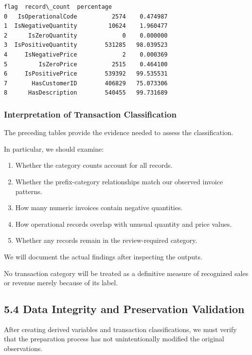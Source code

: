 \documentclass[11pt]{article}
\providecommand{\tightlist}{%
      \setlength{\itemsep}{0pt}\setlength{\parskip}{0pt}}
\begin{document}
    
    \begin{Verbatim}[commandchars=\\\{\}]
                 flag  record\_count  percentage
0   IsOperationalCode          2574    0.474987
1  IsNegativeQuantity         10624    1.960477
2      IsZeroQuantity             0    0.000000
3  IsPositiveQuantity        531285   98.039523
4     IsNegativePrice             2    0.000369
5         IsZeroPrice          2515    0.464100
6     IsPositivePrice        539392   99.535531
7       HasCustomerID        406829   75.073306
8      HasDescription        540455   99.731689
    \end{Verbatim}

    
    \subsubsection{Interpretation of Transaction
Classification}\label{interpretation-of-transaction-classification}

The preceding tables provide the evidence needed to assess the
classification.

In particular, we should examine:

\begin{enumerate}
\def\labelenumi{\arabic{enumi}.}
\tightlist
\item
  Whether the category counts account for all records.
\item
  Whether the prefix-category relationships match our observed invoice
  patterns.
\item
  How many numeric invoices contain negative quantities.
\item
  How operational records overlap with unusual quantity and price
  values.
\item
  Whether any records remain in the review-required category.
\end{enumerate}

We will document the actual findings after inspecting the outputs.

No transaction category will be treated as a definitive measure of
recognized sales or revenue merely because of its label.

    \subsection{5.4 Data Integrity and Preservation
Validation}\label{data-integrity-and-preservation-validation}

After creating derived variables and transaction classifications, we
must verify that the preparation process has not unintentionally
modified the original observations.
\end{document}

